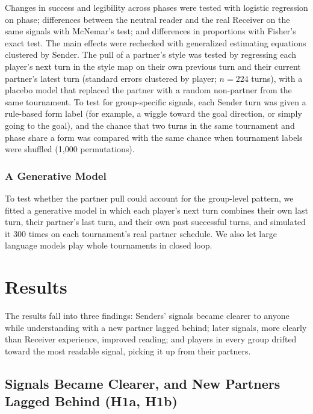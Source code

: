 \documentclass[stu,11pt,floatsintext,donotrepeattitle]{apa7}
\begin{document}
Changes in success and legibility across phases were tested with logistic regression on phase; differences between the neutral reader and the real Receiver on the same signals with McNemar's test; and differences in proportions with Fisher's exact test. The main effects were rechecked with generalized estimating equations clustered by Sender. The pull of a partner's style was tested by regressing each player's next turn in the style map on their own previous turn and their current partner's latest turn (standard errors clustered by player; $n = 224$ turns), with a placebo model that replaced the partner with a random non-partner from the same tournament. To test for group-specific signals, each Sender turn was given a rule-based form label (for example, a wiggle toward the goal direction, or simply going to the goal), and the chance that two turns in the same tournament and phase share a form was compared with the same chance when tournament labels were shuffled (1,000 permutations).

\subsubsection{A Generative Model}

To test whether the partner pull could account for the group-level pattern, we fitted a generative model in which each player's next turn combines their own last turn, their partner's last turn, and their own past successful turns, and simulated it 300 times on each tournament's real partner schedule. We also let large language models play whole tournaments in closed loop.

\section{Results}

The results fall into three findings: Senders' signals became clearer to anyone while understanding with a new partner lagged behind; later signals, more clearly than Receiver experience, improved reading; and players in every group drifted toward the most readable signal, picking it up from their partners.

\subsection{Signals Became Clearer, and New Partners Lagged Behind (H1a, H1b)}
\end{document}
